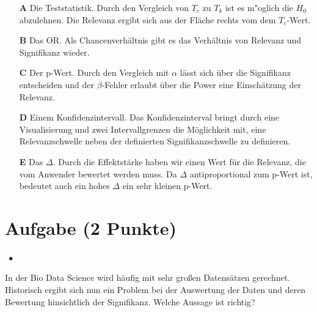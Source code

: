 \documentclass[a4paper, 9pt]{scrartcl}\usepackage[]{graphicx}\usepackage[]{xcolor}
\begin{document}
\begin{enumerate}
\item [\textbf{A} \msquare] Die Teststatistik. Durch den Vergleich von $T_c$ zu $T_k$ ist es m{"o}glich die $H_0$ abzulehnen. Die Relevanz ergibt sich aus der Fläche rechts vom dem $T_c$-Wert.
\item [\textbf{B} \msquare] Das OR. Als Chancenverhältnis gibt es das Verhältnis von Relevanz und Signifikanz wieder.
\item [\textbf{C} \msquare] Der p-Wert. Durch den Vergleich mit $\alpha$ lässt sich über die Signifikanz entscheiden und der $\beta$-Fehler erlaubt über die Power eine Einschätzung der Relevanz.
\item [\textbf{D} \msquare] Einem Konfidenzintervall. Das Konfidenzinterval bringt durch eine Visualisierung und zwei Intervallgrenzen die Möglichkeit mit, eine Relevanzschwelle neben der definierten Signifikanzschwelle zu definieren.
\item [\textbf{E} \msquare] Das $\Delta$. Durch die Effektstärke haben wir einen Wert für die Relevanz, die vom Anwender bewertet werden muss. Da $\Delta$ antiproportional zum p-Wert ist, bedeutet auch ein hohes $\Delta$ ein sehr kleinen p-Wert.
\end{enumerate}

\section{Aufgabe \hfill (2 Punkte)}

\ifcollection
\begin{flushright}
\tiny\vspace{-2Ex}
\textbf{\examinhaltstart}
\exammodulestatversuch $\;\bullet$
\exammodulebiostat
\vspace{-1Ex}
\end{flushright}
\fi




In der Bio Data Science wird häufig mit sehr großen Datensätzen gerechnet. Historisch ergibt sich nun ein Problem bei der Auswertung der Daten und deren Bewertung hinsichtlich der Signifikanz. Welche Aussage ist richtig?
\end{document}
